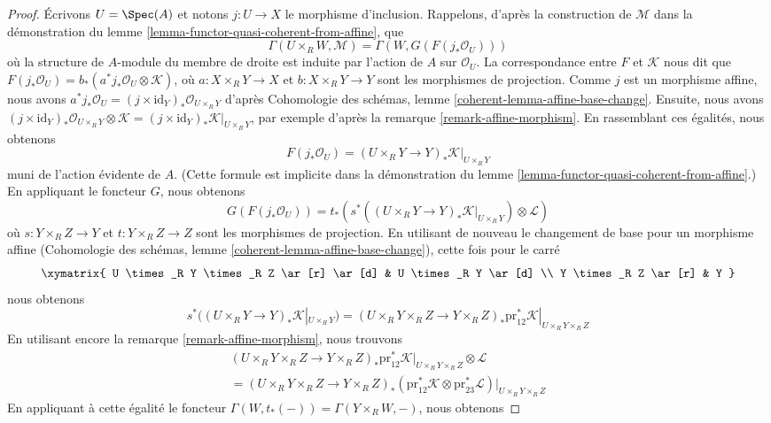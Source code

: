\begin{proof}
\medskip\noindent
Écrivons $U = \Spec(A)$ et notons $j : U \to X$ le morphisme d'inclusion.
Rappelons, d'après la construction de $\mathcal{M}$ dans la démonstration du
lemme \ref{lemma-functor-quasi-coherent-from-affine}, que
$$
\Gamma(U \times_R W, \mathcal{M}) =
\Gamma(W, G(F(j_*\mathcal{O}_U)))
$$
où la structure de $A$-module du membre de droite est induite par
l'action de $A$ sur $\mathcal{O}_U$. La correspondance entre
$F$ et $\mathcal{K}$ nous dit que
$F(j_*\mathcal{O}_U) = b_*(a^*j_*\mathcal{O}_U \otimes \mathcal{K})$,
où $a : X \times_R Y \to X$ et $b : X \times_R Y \to Y$ sont
les morphismes de projection. Comme $j$ est un morphisme affine, nous avons
$a^*j_*\mathcal{O}_U = (j \times \text{id}_Y)_*\mathcal{O}_{U \times_R Y}$
d'après Cohomologie des schémas, lemme
\ref{coherent-lemma-affine-base-change}.
Ensuite, nous avons
$(j \times \text{id}_Y)_*\mathcal{O}_{U \times_R Y} \otimes \mathcal{K} =
(j \times \text{id}_Y)_*\mathcal{K}|_{U \times_R Y}$,
par exemple d'après la remarque \ref{remark-affine-morphism}.
En rassemblant ces égalités, nous obtenons
$$
F(j_*\mathcal{O}_U) =
(U \times_R Y \to Y)_*\mathcal{K}|_{U \times_R Y}
$$
muni de l'action évidente de $A$. (Cette formule est implicite dans la
démonstration du lemme \ref{lemma-functor-quasi-coherent-from-affine}.)
En appliquant le foncteur $G$, nous obtenons
$$
G(F(j_*\mathcal{O}_U)) =
t_*(s^*((U \times_R Y \to Y)_*\mathcal{K}|_{U \times_R Y})
\otimes \mathcal{L})
$$
où $s : Y \times_R Z \to Y$ et $t : Y \times_R Z \to Z$ sont
les morphismes de projection. En utilisant de nouveau le changement de base
pour un morphisme affine (Cohomologie des schémas, lemme
\ref{coherent-lemma-affine-base-change}), cette fois pour le carré
$$
\xymatrix{
U \times_R Y \times_R Z \ar[r] \ar[d] & U \times_R Y \ar[d] \\
Y \times_R Z \ar[r] & Y
}
$$
nous obtenons
$$
s^*((U \times_R Y \to Y)_*\mathcal{K}|_{U \times_R Y}) =
(U \times_R Y \times_R Z \to Y \times_R Z)_*
\text{pr}_{12}^*\mathcal{K}|_{U \times_R Y \times_R Z}
$$
En utilisant encore la remarque \ref{remark-affine-morphism}, nous trouvons
\begin{align*}
(U \times_R Y \times_R Z \to Y \times_R Z)_*
\text{pr}_{12}^*\mathcal{K}|_{U \times_R Y \times_R Z}
\otimes \mathcal{L} \\
=
(U \times_R Y \times_R Z \to Y \times_R Z)_*
\left(\text{pr}_{12}^*\mathcal{K} \otimes
\text{pr}_{23}^*\mathcal{L}\right)|_{U \times_R Y \times_R Z}
\end{align*}
En appliquant à cette égalité le foncteur
$\Gamma(W, t_*(-)) = \Gamma(Y \times_R W, -)$, nous obtenons

\end{proof}
